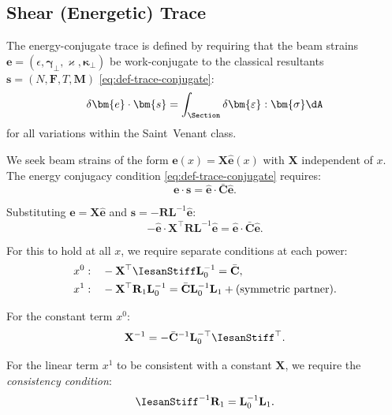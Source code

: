 \subsection{Shear (Energetic) Trace}\label{sec:trace-energy}

The energy-conjugate trace is defined by requiring that the beam strains 
$\bm{e} = (\epsilon, \bm{\gamma}_\perp, \varkappa, \bm{\kappa}_\perp)$ 
be work-conjugate to the classical resultants 
$\bm{s} = (N, \bm{F}, T, \bm{M})$
\eqref{eq:def-trace-conjugate}:
\begin{equation*}
\delta\bm{e}\cdot \bm{s} = \int_\Section \delta\bm{\varepsilon} : \bm{\sigma} \dA
\end{equation*}
for all variations within the Saint~Venant class.

We seek beam strains of the form $\bm{e}(x) = \mathbf{X}\hat{\bm{e}}(x)$ with 
$\mathbf{X}$ independent of $x$. 
The energy conjugacy condition 
\eqref{eq:def-trace-conjugate} requires:
\begin{equation}
\bm{e}\cdot \bm{s} = \hat{\bm{e}}\cdot \bar{\mathbf{C}} \hat{\bm{e}}.
\end{equation}

Substituting $\bm{e} = \mathbf{X}\hat{\bm{e}}$ and $\bm{s} = -\mathbf{R}\mathbf{L}^{-1}\hat{\bm{e}}$:
\begin{equation*}
-\hat{\bm{e}}\cdot \mathbf{X}^\top \mathbf{R} \mathbf{L}^{-1} \hat{\bm{e}} 
= \hat{\bm{e}}\cdot \bar{\mathbf{C}} \hat{\bm{e}}.
\end{equation*}

For this to hold at all $x$, we require separate conditions at each power:
\begin{align*}
x^0: \quad & -\mathbf{X}^\top \IesanStiff \mathbf{L}_0^{-1} = \bar{\mathbf{C}}, 
\\ %
x^1: \quad & -\mathbf{X}^\top \mathbf{R}_1 \mathbf{L}_0^{-1} = \bar{\mathbf{C}} \mathbf{L}_0^{-1} \mathbf{L}_1 
+ \text{(symmetric partner)}.
\end{align*}

For the constant term \(x^0\): %
\begin{equation}
\mathbf{X}^{-1} = -\bar{\mathbf{C}}^{-1} \mathbf{L}_0^{-\top} \IesanStiff^\top.
\label{eq:X-inv-formula}
\end{equation}

For the linear term \(x^1\) %
to be consistent with a constant $\mathbf{X}$, 
we require the \emph{consistency condition}:
\begin{equation}
\IesanStiff^{-1} \mathbf{R}_1 = \mathbf{L}_0^{-1} \mathbf{L}_1.
\label{eq:consistency-condition}
\end{equation}

